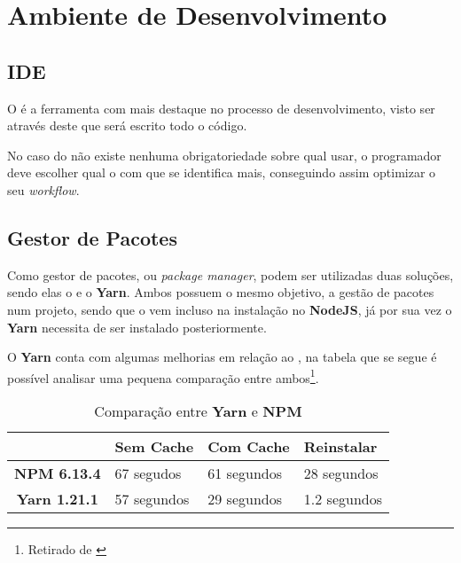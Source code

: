 \section{Ambiente de Desenvolvimento}

\subsection{IDE}

O  é a ferramenta com mais destaque no processo de desenvolvimento, visto ser através deste que será escrito todo o código.

No caso do  não existe nenhuma obrigatoriedade sobre qual usar, o programador deve escolher qual o  com que se identifica mais, conseguindo assim optimizar o seu \textit{workflow}.




\subsection{Gestor de Pacotes}

Como gestor de pacotes, ou \textit{package manager}, podem ser utilizadas duas soluções, sendo elas o \textbf{} e o \textbf{Yarn}. Ambos possuem o mesmo objetivo, a gestão de pacotes num projeto, sendo que o \textbf{} vem incluso na instalação no \textbf{NodeJS}, já por sua vez o \textbf{Yarn} necessita de ser instalado posteriormente.

O \textbf{Yarn} conta com algumas melhorias em relação ao \textbf{}, na tabela que se segue é possível analisar uma pequena comparação entre ambos\footnote{Retirado de \cite{yarnVSNpm}}.

\begin{table}[h!]
	\renewcommand{\arraystretch}{1.25}
	\centering
	\begin{tabularx}{.85\textwidth}{ |c X X X| }
		\rowcolor{estg} & {\color[HTML]{FFFFFF} \textbf{Sem Cache}} & 	{\color[HTML]{FFFFFF} \textbf{Com Cache}} & {\color[HTML]{FFFFFF} \textbf{Reinstalar}} \\\hline


		\textbf{NPM 6.13.4} & 67 segudos & 61 segundos & 28 segundos \\\hline
		\textbf{Yarn 1.21.1} & 57 segundos & 29 segundos & 1.2 segundos \\\hline
	\end{tabularx}

	\caption{Comparação entre \textbf{Yarn} e \textbf{NPM}}
\end{table}

